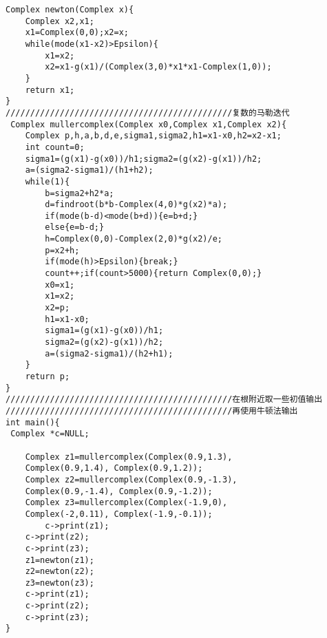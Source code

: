\documentclass[a4paper,11pt,onecolumn,twoside]{article}
\begin{document}
\begin{appendices}
\begin{lstlisting}
Complex newton(Complex x){
    Complex x2,x1;
    x1=Complex(0,0);x2=x;
    while(mode(x1-x2)>Epsilon){
        x1=x2;
        x2=x1-g(x1)/(Complex(3,0)*x1*x1-Complex(1,0));
    }
    return x1;
}
//////////////////////////////////////////////复数的马勒迭代
 Complex mullercomplex(Complex x0,Complex x1,Complex x2){
    Complex p,h,a,b,d,e,sigma1,sigma2,h1=x1-x0,h2=x2-x1;
    int count=0;
    sigma1=(g(x1)-g(x0))/h1;sigma2=(g(x2)-g(x1))/h2;
    a=(sigma2-sigma1)/(h1+h2);
    while(1){
        b=sigma2+h2*a;
        d=findroot(b*b-Complex(4,0)*g(x2)*a);
        if(mode(b-d)<mode(b+d)){e=b+d;}
        else{e=b-d;}
        h=Complex(0,0)-Complex(2,0)*g(x2)/e;
        p=x2+h;
        if(mode(h)>Epsilon){break;}
        count++;if(count>5000){return Complex(0,0);}
        x0=x1;
        x1=x2;
        x2=p;
        h1=x1-x0;
        sigma1=(g(x1)-g(x0))/h1;
        sigma2=(g(x2)-g(x1))/h2;
        a=(sigma2-sigma1)/(h2+h1);
    }
    return p;
}
//////////////////////////////////////////////在根附近取一些初值输出
//////////////////////////////////////////////再使用牛顿法输出
int main(){
 Complex *c=NULL;

    Complex z1=mullercomplex(Complex(0.9,1.3), 
    Complex(0.9,1.4), Complex(0.9,1.2));
    Complex z2=mullercomplex(Complex(0.9,-1.3), 
    Complex(0.9,-1.4), Complex(0.9,-1.2));
    Complex z3=mullercomplex(Complex(-1.9,0), 
    Complex(-2,0.11), Complex(-1.9,-0.1));
        c->print(z1);
    c->print(z2);
    c->print(z3);
    z1=newton(z1);
    z2=newton(z2);
    z3=newton(z3);
    c->print(z1);
    c->print(z2);
    c->print(z3);
}
\end{lstlisting}
 \end{appendices}
\end{document}
